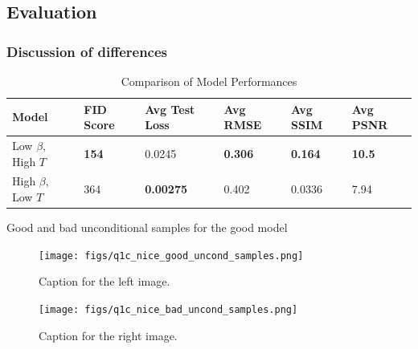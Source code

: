 \documentclass[11pt]{article}
\begin{document}
\subsection{Evaluation}
\subsubsection{Discussion of differences}
\begin{table}[H]
    \centering
    \caption{Comparison of Model Performances}
    \begin{tabular}{l|lllll}
    \hline
    Model          & FID Score           & Avg Test Loss        & Avg RMSE           & Avg SSIM         & Avg PSNR           \\ \hline
    Low $\beta$, High $T$ & \textbf{154}    & 0.0245              & \textbf{0.306}            & \textbf{0.164} & \textbf{10.5}    \\
    High $\beta$, Low $T$  & 364             & \textbf{0.00275}     & 0.402  & 0.0336          & 7.94              \\ \hline
    \end{tabular}
    \end{table}


Good and bad unconditional samples for the good model
\begin{figure}[H]
    \centering
    \begin{minipage}{0.48\textwidth}
        \texttt{[image: figs/q1c\_nice\_good\_uncond\_samples.png]}
        \caption{Caption for the left image.}
        \label{fig:left_img_2}
    \end{minipage}\hfill
    \begin{minipage}{0.48\textwidth}
        \texttt{[image: figs/q1c\_nice\_bad\_uncond\_samples.png]}
        \caption{Caption for the right image.}
        \label{fig:right_img_2}
    \end{minipage}
\end{figure}
\end{document}
